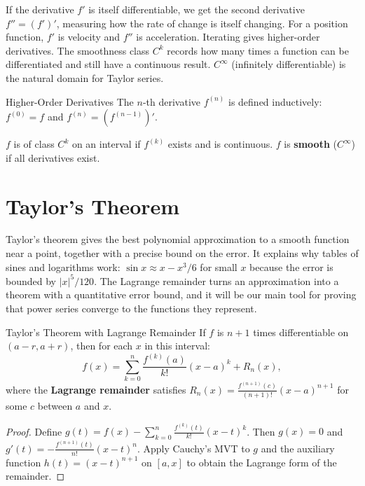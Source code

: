\documentclass[12pt, openany]{book}
\theoremstyle{plain}
\theoremstyle{definition}
\theoremstyle{remark}
\begin{document}
If the derivative $f'$ is itself differentiable, we get the second derivative $f'' = (f')'$, measuring how the rate of change is itself changing.  For a position function, $f'$ is velocity and $f''$ is acceleration.  Iterating gives higher-order derivatives.  The smoothness class $C^k$ records how many times a function can be differentiated and still have a continuous result.  $C^\infty$ (infinitely differentiable) is the natural domain for Taylor series.

\begin{defbox}{Higher-Order Derivatives}
The $n$-th derivative $f^{(n)}$ is defined inductively: $f^{(0)} = f$ and $f^{(n)} = (f^{(n-1)})'$.

$f$ is of class $C^k$ on an interval if $f^{(k)}$ exists and is continuous. $f$ is \textbf{smooth} ($C^\infty$) if all derivatives exist.
\end{defbox}
\color{black}

\section{Taylor's Theorem}

Taylor's theorem gives the best polynomial approximation to a smooth function near a point, together with a precise bound on the error.  It explains why tables of sines and logarithms work: $\sin x \approx x - x^3/6$ for small $x$ because the error is bounded by $|x|^5/120$.  The Lagrange remainder turns an approximation into a theorem with a quantitative error bound, and it will be our main tool for proving that power series converge to the functions they represent.

\begin{thmbox}{Taylor's Theorem with Lagrange Remainder}
If $f$ is $n+1$ times differentiable on $(a-r, a+r)$, then for each $x$ in this interval:
\[ f(x) = \sum_{k=0}^{n} \frac{f^{(k)}(a)}{k!}(x-a)^k + R_n(x), \]
where the \textbf{Lagrange remainder} satisfies $R_n(x) = \frac{f^{(n+1)}(c)}{(n+1)!}(x-a)^{n+1}$ for some $c$ between $a$ and $x$.
\end{thmbox}
\color{black}

\begin{proof}
Define $g(t) = f(x) - \sum_{k=0}^n \frac{f^{(k)}(t)}{k!}(x-t)^k$. Then $g(x) = 0$ and $g'(t) = -\frac{f^{(n+1)}(t)}{n!}(x-t)^n$. Apply Cauchy's MVT to $g$ and the auxiliary function $h(t) = (x-t)^{n+1}$ on $[a, x]$ to obtain the Lagrange form of the remainder.
\end{proof}
\end{document}
